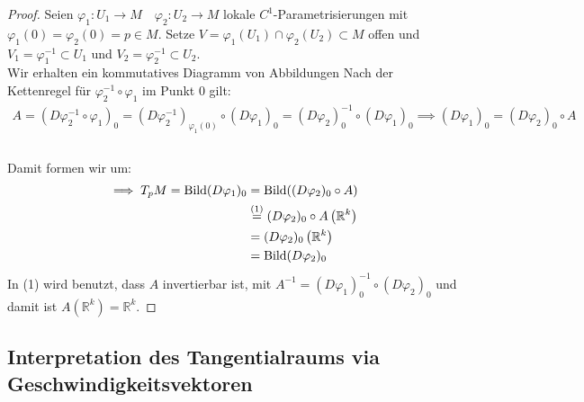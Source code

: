 \documentclass[../main.tex]{subfiles}
\begin{document}
\begin{proof}
Seien $\varphi_1 : U_1 \to M \quad \varphi_2 : U_2 \to M$ lokale $C^1$-Parametrisierungen mit $\varphi_1(0)=\varphi_2(0) = p \in M$. Setze $V = \varphi_1(U_1) \cap \varphi_2(U_2) \subset M$ offen und
$V_1 = \varphi_1^{-1} \subset U_1$ und $V_2 = \varphi_2^{-1} \subset U_2$. \\
Wir erhalten ein kommutatives Diagramm von Abbildungen
Nach der Kettenregel für $\varphi_2^{-1} \circ \varphi_1$ im Punkt $0$ gilt:
\begin{align*}
A = (D\varphi_2^{-1} \circ \varphi_1)_0 = (D\varphi_2^{-1})_{\varphi_1(0)} \circ (D\varphi_1)_0 = 
(D\varphi_2)_0^{-1} \circ (D\varphi_1)_0 \implies (D\varphi_1)_0 = (D\varphi_2)_0 \circ A \\
\end{align*} \\[-2\baselineskip] Damit formen wir um:
\begin{align*}
    \implies T_pM = \operatorname{Bild}(D\varphi_1)_0 & = \operatorname{Bild}((D\varphi_2)_0 \circ A) \\
    &\overset{(1)}{=} (D\varphi_2)_0 \circ A\left(\mathbb{R}^k\right) \\
    &= (D\varphi_2)_0 \left(\mathbb{R}^k\right) \\
    &= \operatorname{Bild}(D\varphi_2)_0
\end{align*}
In (1) wird benutzt, dass $A$ invertierbar ist, mit $A^{-1} = (D\varphi_1)_0^{-1} \circ (D\varphi_2)_0$ und damit ist $A\left(\mathbb{R}^k\right) = \mathbb{R}^k$.
\end{proof}

\subsection*{Interpretation des Tangentialraums via Geschwindigkeitsvektoren}
\end{document}
